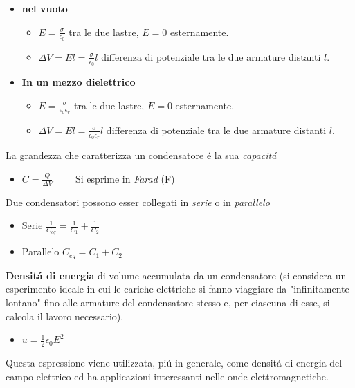 \documentclass[17pt]{article}
\begin{document}
\begin{itemize}
	\item {\bf nel vuoto}
	\begin{itemize}
		\item $E = \frac{\sigma}{\epsilon_0}$ tra le due lastre, $E = 0$ esternamente.
	 	\item $\Delta V = El = \frac{\sigma}{\epsilon_0}l$ differenza di potenziale tra le due armature distanti $l$.
	 \end{itemize}	 
	 \item {\bf In un mezzo dielettrico} 
		\begin{itemize}
		\item $E = \frac{\sigma}{\epsilon_0\epsilon_r}$ tra le due lastre, $E = 0$ esternamente.
		\item $\Delta V = El = \frac{\sigma}{\epsilon_0\epsilon_r}l$ differenza di potenziale tra le due armature distanti $l$.
	\end{itemize}
\end{itemize}
\vspace{1cm}

La grandezza che caratterizza un condensatore \'e la sua \emph{capacit\'a}

\begin{itemize}
	\item $C = \frac{Q}{\Delta V}\qquad$ Si esprime in \emph{Farad} (F)
\end{itemize}


Due condensatori possono esser collegati in \emph{serie} o in \emph{parallelo}

\begin{itemize}
	\item Serie $\frac{1}{C_{eq}} = \frac{1}{C_1} + \frac{1}{C_2}$
	\item Parallelo $C_{eq} = C_1 + C_2$
\end{itemize}

{\bf Densit\'a di energia} di volume accumulata da un condensatore (si considera un esperimento ideale in cui le cariche elettriche si fanno viaggiare da "infinitamente lontano" fino alle armature del condensatore stesso e, per ciascuna di esse, si calcola il lavoro necessario).

\begin{itemize}
	\item $u = \frac{1}{2} \epsilon_0E^2$
\end{itemize}

Questa espressione viene utilizzata, pi\'u in generale, come densit\'a di energia del campo elettrico ed ha applicazioni interessanti nelle onde elettromagnetiche.
\end{document}
